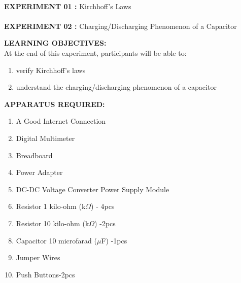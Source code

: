 \documentclass[12pt,a4paper]{article}
\begin{document}
\begin{center}
\textbf{\large \\EXPERIMENT 01 : }Kirchhoff's Laws\\
\textbf{\large \\EXPERIMENT 02 : }Charging/Discharging Phenomenon of a Capacitor
\end{center}

\textbf{\large LEARNING OBJECTIVES:}\\[3pt]
At the end of this experiment, participants will be able to:\vspace{-6mm}\begin{enumerate}
 \setlength\itemsep{-0.3em}
\item verify Kirchhoff's laws
\item understand the charging/discharging phenomenon of a capacitor

\end{enumerate}
\textbf{\large APPARATUS REQUIRED:}\\
\vspace{-3mm}
\begin{enumerate}
 \setlength\itemsep{-0.3em}
\item A Good Internet Connection
\item Digital Multimeter
\item Breadboard
\item Power Adapter
\item DC-DC Voltage Converter Power Supply Module
\item Resistor 1 kilo-ohm (k$\Omega$) - 4pcs
\item Resistor 10 kilo-ohm (k$\Omega$) -2pcs
\item Capacitor 10 microfarad ($\mu$F) -1pcs
\item Jumper Wires
\item Push Buttons-2pcs
\end{enumerate}
\end{document}
